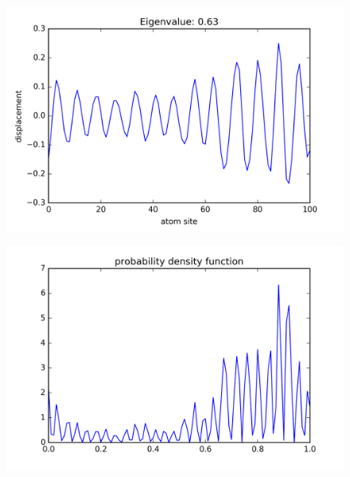 \begin{figure}[!htbh]
\centering
\begin{minipage}{.45\textwidth}
  \centering
  \includegraphics[width=1.1\linewidth]{Harmonic_mass_ratio/normal_Prob_0_5N_103m_2p_26th.png}
  \label{fig:mass low frequency}
\end{minipage}\qquad
\begin{minipage}{.45\textwidth}
  \centering
  \includegraphics[width=1.1\linewidth]{Harmonic_mass_ratio/densProb_0_5N_103m_2p_26th.png}
  \label{fig:N103_1_2_26th_density}
\end{minipage}
\end{figure}

